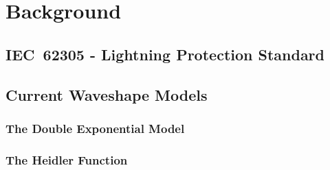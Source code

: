 
\chapter{Background} %

\label{ChapterBackground} %



\section{IEC~62305 - Lightning Protection Standard}
\label{sec:background_iec62305}



\section{Current Waveshape Models}
\label{sec:background_current_waveshape_models}

\subsection{The Double Exponential Model}
\label{sub:background_double_exponential}

\subsection{The Heidler Function}
\label{sub:background_heidler}

